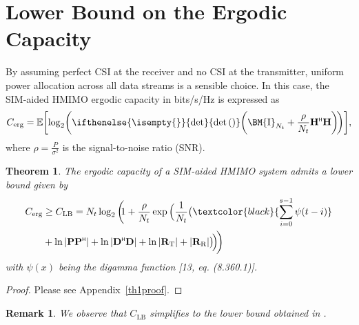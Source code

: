 \documentclass[twocolumn,10pt]{IEEEtran}
\newcommand{\mbs}[1]{\bm{#1}}
\newcommand{\mat}[1]{{\uppercase{\mbs{#1}}}}
\newcommand{\Id}{\mat{\mathrm{I}}}
\renewcommand{\H}{{\scriptscriptstyle\mathsf{H}}}
\def\bD{{\mathbf{D}}}
\def\bH{{\mathbf{H}}}
\def\bP{{\mathbf{P}}}
\def\bR{{\mathbf{R}}}
\newcommand{\EE}{\mathbb{E}}
\renewcommand{\det}[1][]{\ifthenelse{\isempty{#1}}{\text{det}}{\text{det}\left(#1\right)}}
\def\nn{\nonumber}
\newtheorem{remark}{Remark}%
\newtheorem{theorem}{Theorem}%
\begin{document}
	\section{Lower Bound on the Ergodic Capacity}\label{ErgodicCapacity}
	By assuming perfect CSI at the receiver and no CSI at the transmitter, uniform power allocation across all data streams is a sensible choice. In this case, the SIM-aided HMIMO  ergodic capacity in bits/s/Hz is expressed as
	\begin{align}
		C_{\mathrm{erg}}=\EE\bigg[\!\log_{2}\!\left(\det\!\left(\Id_{N_{t}}+\frac{\rho}{N_{t}}\bH^{\H}\bH\right)\!\right)\!\bigg],\label{MI}
	\end{align}
	where $\rho=\frac{P}{\sigma^{2}}$ is the signal-to-noise ratio (SNR).
	\begin{theorem}\label{th1}
	The ergodic capacity of a  SIM-aided HMIMO system admits a lower bound given by
		\begin{align}
			C_{\mathrm{erg}}&\ge 	C_{\mathrm{LB}}=N_{t} \log_{2}\bigg(\!\!1+\frac{\rho}{N_{t}} \exp \Big(\frac{1}{N_{t}}\big(\textcolor{black}{\sum_{i=0}^{s-1}\psi(t-i)}\nn\\
			&+\ln |\bP\bP^{\H}|+\ln |\bD^{\H}\bD|+\ln |\bR_{\mathrm{T}}|+|\bR_{\mathrm{R}}|\big)\!\Big)\!\bigg)\label{capacity0}
		\end{align}
		with $\psi(x)$ being the digamma function [13, eq. (8.360.1)].
	\end{theorem}
	\begin{proof}
		Please see Appendix~\ref{th1proof}.	
	\end{proof}
	\begin{remark}
		We observe that $	C_{\mathrm{LB}} $ simplifies to the lower bound obtained in \cite[Eq. 5]{Matthaiou2011a}.
	\end{remark}
	
\end{document}

